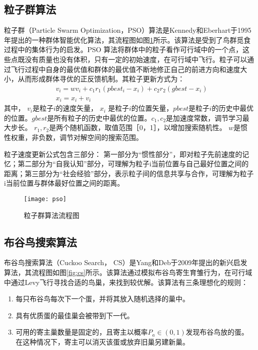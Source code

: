   \subsection{粒子群算法}
  粒子群（Particle Swarm Optimization，PSO）算法是Kennedy和Eberhart于1995年提出的一种群体智能优化算法，其流程图如图\ref{fig:pso}所示。该算法是受到了鸟群觅食过程中的集体行为的启发。PSO 算法将群体中的粒子看作可行域中的一个点，这些点既没有质量也没有体积，只有一定的初始速度，在可行域中飞行。粒子可以通过飞行过程中自身的最优值和群体的最优值不断地修正自己的前进方向和速度大小，从而形成群体寻优的正反馈机制。其粒子更新方式为：
  \begin{align}
    &v_i= wv_i +c_1r_1(pbest_i-x_i )+c_2r_2(gbest-x_i )\\
    &x_{i} = x_i+v_i 
  \end{align}
  其中， $v_i$是粒子$i$的速度矢量， $x_i$ 是粒子$i$的位置矢量，$pbest$是粒子$i$的历史中最优的位置。$gbest$是所有粒子的历史中最优的位置。$c_1,c_2$是加速度常数，调节学习最大步长。 $r_1,r_2$是两个随机函数，取值范围［0，1］，以增加搜索随机性。 $w$是惯性权重，非负数，调节对解空间的搜索范围。

  粒子速度更新公式包含三部分： 第一部分为“惯性部分”，即对粒子先前速度的记忆；第二部分为“自我认知”部分，可理解为粒子i当前位置与自己最好位置之间的距离；第三部分为“社会经验”部分，表示粒子间的信息共享与合作，可理解为粒子i当前位置与群体最好位置之间的距离。
  \begin{figure}[htbp]
    \centering
    \texttt{[image: pso]}
    \caption{粒子群算法流程图}
    \label{fig:pso}
  \end{figure}

  \subsection{布谷鸟搜索算法}
    布谷鸟搜索算法（Cuckoo Search， CS）是Yang和Deb于2009年提出的新兴启发算法，其流程图如图\ref{fig:cs}所示。该算法通过模拟布谷鸟寄生育雏行为，在可行域中通过Levy飞行寻找合适的鸟巢，来找到较优解。该算法有三条理想化的规则：
    \begin{enumerate}
      \item {每只布谷鸟每次下一个蛋，并将其放入随机选择的巢中。}
      \item {具有优质蛋的最佳巢会被带到下一代。}
      \item {可用的寄主巢数量是固定的，且寄主以概率$P_a\in(0,1)$发现布谷鸟放的蛋。在这种情况下，寄主可以消灭该蛋或放弃旧巢另建新巢。}
    \end{enumerate}

